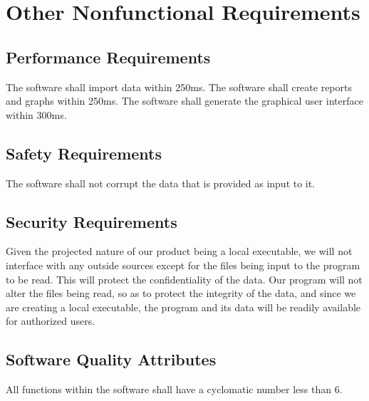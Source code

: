\section{Other Nonfunctional Requirements}
%

\subsection{Performance Requirements}

The software shall import data within 250ms.
The software shall create reports and graphs within 250ms.
The software shall generate the graphical user interface within 300ms.

\subsection{Safety Requirements}

The software shall not corrupt the data that is provided as input to it.

\subsection{Security Requirements}
Given the projected nature of our product being a local executable, we will not interface with any outside sources except for the files being input to the program to be read. This will protect the confidentiality of the data. Our program will not alter the files being read, so as to protect the integrity of the data, and since we are creating a local executable, the program and its data will be readily available for authorized users.

\subsection{Software Quality Attributes}

All functions within the software shall have a cyclomatic number less than 6.